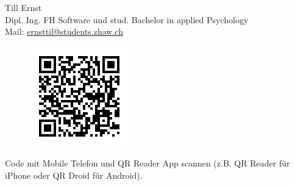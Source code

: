 \begin{RaggedRight}
Till Ernst\\
Dipl. Ing. FH Software und stud. Bachelor in applied Psychology\\
Mail: \href{mailto:ernsttil@students.zhaw.ch}{ernsttil@students.zhaw.ch}\\
\begin{figure}[h]
    \centering
    \includegraphics[scale=0.5]{images/anhang/umfrage_qr_code.png}
\end{figure}
Code mit Mobile ­Telefon und QR ­Reader ­App scannen (z.B. QR Reader für iPhone oder QR Droid für Android).
\end{RaggedRight}
